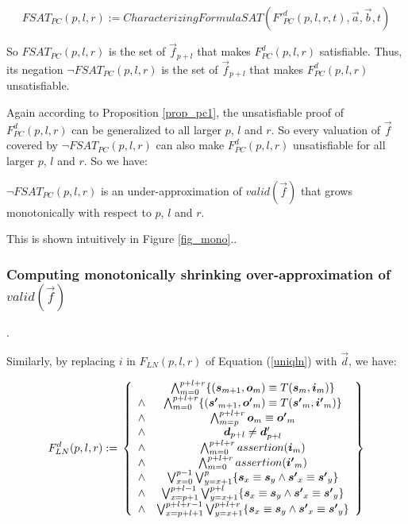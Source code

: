 \documentclass[runningheads,a4paper,orivec]{llncs}
\begin{document}
\begin{equation}\label{fsat_pc}
FSAT_{PC}(p,l,r):=CharacterizingFormulaSAT(F'^d_{PC}(p,l,r,t),\vec{a},\vec{b},t)
\end{equation}

So $FSAT_{PC}(p,l,r)$ is the set of $\vec{f}_{p+l}$ 
that makes $F^d_{PC}(p,l,r)$ satisfiable.
Thus,
its negation $\neg FSAT_{PC}(p,l,r)$ is the set of $\vec{f}_{p+l}$ 
that makes $F^d_{PC}(p,l,r)$ unsatisfiable.

Again according to Proposition \ref{prop_pc1},
the unsatisfiable proof of $F^d_{PC}(p,l,r)$ can be generalized to all larger $p$, $l$ and $r$.
So every valuation of $\vec{f}$ covered by $\neg FSAT_{PC}(p,l,r)$ can also make $F^d_{PC}(p,l,r)$ unsatisfiable for all larger $p$, $l$ and $r$.
So we have:

\begin{proposition}\label{prop_pc}
$\neg FSAT_{PC}(p,l,r)$ is an under-approximation of $valid(\vec{f})$ that grows monotonically with respect to $p$, $l$ and $r$.
\end{proposition}





This is shown intuitively in Figure \ref{fig_mono}..

\subsubsection{\textbf{Computing monotonically shrinking over-approximation of $valid(\vec{f})$}}\label{subsub_loop}.

Similarly,
by replacing $i$ in $F_{LN}(p,l,r)$ of Equation (\ref{uniqln}) with $\vec{d}$,
we have:

\begin{equation}\label{uniqlnd}
F^d_{LN}(p,l,r):=\\
\left\{
\begin{array}{cc}
&\bigwedge_{m=0}^{p+l+r}
\{
(\vec{s}_{m+1},\vec{o}_m)\equiv T(\vec{s}_m,\vec{i}_m)
\}
\\
\wedge&\bigwedge_{m=0}^{p+l+r}
\{
(\vec{s'}_{m+1},\vec{o'}_m)\equiv T(\vec{s'}_m,\vec{i'}_m)
\}
\\
\wedge&\bigwedge_{m=p}^{p+l+r}\vec{o}_m\equiv \vec{o'}_m \\
\wedge& \vec{d}_{p+l}\ne \vec{d}'_{p+l} \\
\wedge&\bigwedge_{m=0}^{p+l+r}assertion(\vec{i}_m) \\
\wedge&\bigwedge_{m=0}^{p+l+r}assertion(\vec{i'}_m) \\
\wedge&\bigvee_{x=0}^{p-1}\bigvee_{y=x+1}^{p} \{\vec{s}_x\equiv \vec{s}_y\wedge \vec{s'}_x\equiv \vec{s'}_y\} \\
\wedge&\bigvee_{x=p+1}^{p+l-1}\bigvee_{y=x+1}^{p+l} \{\vec{s}_x\equiv \vec{s}_y\wedge \vec{s'}_x\equiv \vec{s'}_y\} \\
\wedge&\bigvee_{x=p+l+1}^{p+l+r-1}\bigvee_{y=x+1}^{p+l+r} \{\vec{s}_x\equiv \vec{s}_y\wedge \vec{s'}_x\equiv \vec{s'}_y\}
\end{array}
\right\}
\end{equation}
\end{document}
